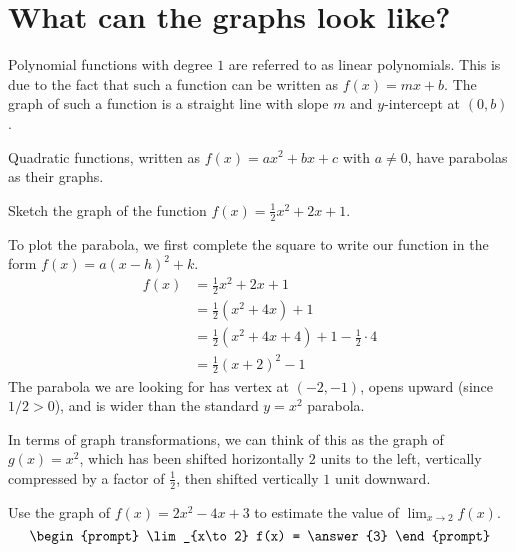 \documentclass{ximera}
\begin{document}
\section{What can the graphs look like?}
Polynomial functions with degree $1$ are referred to as linear polynomials.  This is due to the fact
that such a function can be written as $f(x) = mx + b$.  The graph of such a function is a straight line
with slope $m$ and $y$-intercept at $(0,b)$.

Quadratic functions, written as $f(x) = ax^2 + bx + c$ with $a \ne 0$, have parabolas as their graphs.
\begin{example}
	Sketch the graph of the function $f(x) = \frac{1}{2} x^2 + 2x + 1$.
	\begin{explanation}
		To plot the parabola, we first complete the square to write our function in the form $f(x) = a(x-h)^2 +k$.
		\begin{align*}
			f(x) &= \frac{1}{2} x^2 + 2x + 1 \\
				&= \frac{1}{2} \left( x^2+ 4x \right) + 1\\
				&= \frac{1}{2}\left( x^2 + 4x + 4\right) + 1 - \frac{1}{2} \cdot 4\\
				&= \frac{1}{2} \left( x+2 \right)^2 -1
		\end{align*}
		The parabola we are looking for has vertex at $(-2, -1)$, opens upward (since $1/2 > 0$), and is wider than the standard
		$y=x^2$ parabola.
		
		In terms of graph transformations, we can think of this as the graph of $g(x) = x^2$, which has been shifted horizontally $2$ units to the left,
		vertically compressed by a factor of $\frac{1}{2}$, then shifted vertically $1$ unit downward.
	\end{explanation}
\end{example}


\begin{problem}
	Use the graph of $f(x) = 2x^2 - 4x + 3$ to estimate the value of $\lim_{x\to 2} f(x)$.
	\[ \begin{prompt} 
		\lim_{x\to 2} f(x) = \answer{3} 
	\end{prompt}\]
\end{problem} 
\end{document}
